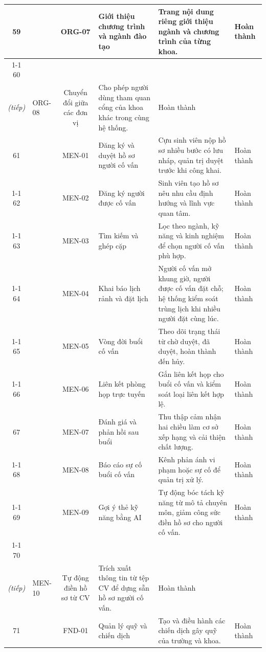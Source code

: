 \documentclass[12pt,a4paper,oneside]{report}
\begin{document}
\begin{longtable}{|c|>{\raggedright\arraybackslash}p{2.5cm}|c|>{\raggedright\arraybackslash}p{3.1cm}|>{\raggedright\arraybackslash}p{5.0cm}|>{\raggedright\arraybackslash}p{1.9cm}|}
\hline
59 &  & ORG-07 & Giới thiệu chương trình và ngành đào tạo & Trang nội dung riêng giới thiệu ngành và chương trình của từng khoa. & Hoàn thành \\
\cline{1-1}\cline{3-6}
60 & \multirow{-2}{2.4cm}{\textbf{Tổ chức và đa đơn vị\\\textit{(tiếp)}}} & ORG-08 & Chuyển đổi giữa các đơn vị & Cho phép người dùng tham quan cổng của khoa khác trong cùng hệ thống. & Hoàn thành \\
\hline
61 &  & MEN-01 & Đăng ký và duyệt hồ sơ người cố vấn & Cựu sinh viên nộp hồ sơ nhiều bước có lưu nháp, quản trị duyệt trước khi công khai. & Hoàn thành \\
\cline{1-1}\cline{3-6}
62 &  & MEN-02 & Đăng ký người được cố vấn & Sinh viên tạo hồ sơ nêu nhu cầu định hướng và lĩnh vực quan tâm. & Hoàn thành \\
\cline{1-1}\cline{3-6}
63 &  & MEN-03 & Tìm kiếm và ghép cặp & Lọc theo ngành, kỹ năng và kinh nghiệm để chọn người cố vấn phù hợp. & Hoàn thành \\
\cline{1-1}\cline{3-6}
64 &  & MEN-04 & Khai báo lịch rảnh và đặt lịch & Người cố vấn mở khung giờ, người được cố vấn đặt chỗ; hệ thống kiểm soát trùng lịch khi nhiều người đặt cùng lúc. & Hoàn thành \\
\cline{1-1}\cline{3-6}
65 &  & MEN-05 & Vòng đời buổi cố vấn & Theo dõi trạng thái từ chờ duyệt, đã duyệt, hoàn thành đến hủy. & Hoàn thành \\
\cline{1-1}\cline{3-6}
66 & \multirow{-6}{2.4cm}{\textbf{Cố vấn}} & MEN-06 & Liên kết phòng họp trực tuyến & Gắn liên kết họp cho buổi cố vấn và kiểm soát loại liên kết hợp lệ. & Hoàn thành \\
\hline
67 &  & MEN-07 & Đánh giá và phản hồi sau buổi & Thu thập cảm nhận hai chiều làm cơ sở xếp hạng và cải thiện chất lượng. & Hoàn thành \\
\cline{1-1}\cline{3-6}
68 &  & MEN-08 & Báo cáo sự cố buổi cố vấn & Kênh phản ánh vi phạm hoặc sự cố để quản trị xử lý. & Hoàn thành \\
\cline{1-1}\cline{3-6}
69 &  & MEN-09 & Gợi ý thẻ kỹ năng bằng AI & Tự động bóc tách kỹ năng từ mô tả chuyên môn, giảm công sức điền hồ sơ cho người cố vấn. & Hoàn thành \\
\cline{1-1}\cline{3-6}
70 & \multirow{-4}{2.4cm}{\textbf{Cố vấn\\\textit{(tiếp)}}} & MEN-10 & Tự động điền hồ sơ từ CV & Trích xuất thông tin từ tệp CV để dựng sẵn hồ sơ người cố vấn. & Hoàn thành \\
\hline
71 &  & FND-01 & Quản lý quỹ và chiến dịch & Tạo và điều hành các chiến dịch gây quỹ của trường và khoa. & Hoàn thành \\

\end{longtable}
\end{document}
